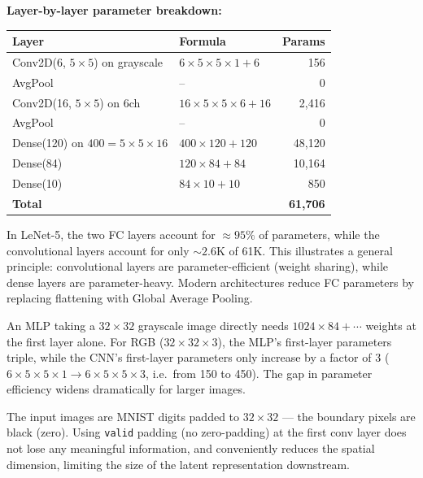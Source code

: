 \documentclass[11pt,a4paper]{article}
\begin{document}
\begin{tcolorbox}[colback=NoteGrayBg,colframe=NoteGray,boxrule=0.8pt,arc=3pt]
\textbf{Layer-by-layer parameter breakdown:}\\[4pt]
\begin{tabular}{@{}llr@{}}
\toprule
Layer & Formula & Params \\
\midrule
Conv2D(6, $5\times5$) on grayscale & $6\times5\times5\times1 + 6$ & 156 \\
AvgPool & -- & 0 \\
Conv2D(16, $5\times5$) on 6ch & $16\times5\times5\times6 + 16$ & 2,416 \\
AvgPool & -- & 0 \\
Dense(120) on $400=5\times5\times16$ & $400\times120 + 120$ & 48,120 \\
Dense(84) & $120\times84 + 84$ & 10,164 \\
Dense(10) & $84\times10 + 10$ & 850 \\
\midrule
\textbf{Total} & & \textbf{61,706} \\
\bottomrule
\end{tabular}
\end{tcolorbox}

\begin{insightbox}
In LeNet-5, the two FC layers account for $\approx 95\%$ of parameters, while the convolutional layers account for only $\sim2.6$K of 61K. This illustrates a general principle: convolutional layers are parameter-efficient (weight sharing), while dense layers are parameter-heavy. Modern architectures reduce FC parameters by replacing flattening with Global Average Pooling.
\end{insightbox}

\begin{insightbox}
An MLP taking a $32\times32$ grayscale image directly needs $1024\times84 + \cdots$ weights at the first layer alone. For RGB ($32\times32\times3$), the MLP's first-layer parameters triple, while the CNN's first-layer parameters only increase by a factor of 3 ($6\times5\times5\times1 \to 6\times5\times5\times3$, i.e.\ from 150 to 450). The gap in parameter efficiency widens dramatically for larger images.
\end{insightbox}

\begin{warnbox}
The input images are MNIST digits padded to $32\times32$ — the boundary pixels are black (zero). Using \texttt{valid} padding (no zero-padding) at the first conv layer does not lose any meaningful information, and conveniently reduces the spatial dimension, limiting the size of the latent representation downstream.
\end{warnbox}
\end{document}
